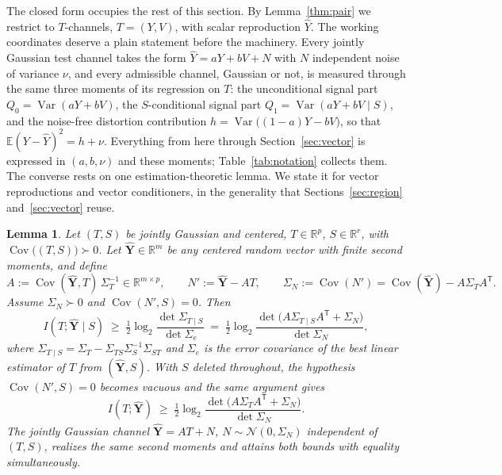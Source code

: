 \documentclass[11pt,onecolumn]{IEEEtran}
\newtheorem{lemma}[theorem]{Lemma}
\newcommand{\E}{\mathbb{E}}
\newcommand{\R}{\mathbb{R}}
\newcommand{\Cov}{\operatorname{Cov}}
\newcommand{\hY}{\widehat{Y}}
\begin{document}
The closed form occupies the rest of this section. By
Lemma~\ref{thm:pair} we restrict to $T$-channels, $T=(Y,V)$, with
scalar reproduction $\hY$. The working coordinates deserve a plain
statement before the machinery. Every jointly Gaussian test channel
takes the form $\hY=aY+bV+N$ with $N$ independent noise of variance
$\nu$, and every admissible channel, Gaussian or not, is measured through
the same three moments of its regression on $T$: the unconditional
signal part $Q_0=\operatorname{Var}(aY+bV)$, the $S$-conditional signal
part $Q_1=\operatorname{Var}(aY+bV\mid S)$, and the noise-free
distortion contribution $h=\operatorname{Var}\bigl((1-a)Y-bV\bigr)$, so
that $\E(Y-\hY)^2=h+\nu$. Everything from here through
Section~\ref{sec:vector} is expressed in $(a,b,\nu)$ and these moments;
Table~\ref{tab:notation} collects them. The converse rests on one
estimation-theoretic lemma. We state it for vector reproductions and
vector conditioners, in the generality that
Sections~\ref{sec:region} and~\ref{sec:vector} reuse.

\begin{lemma}
\label{lem:gauss}
Let $(T,S)$ be jointly Gaussian and centered, $T\in\R^p$, $S\in\R^r$,
with $\Cov\bigl((T,S)\bigr)\succ0$. Let $\hat{\mathbf Y}\in\R^m$ be any
centered random vector with finite second moments, and define
\[
A:=\Cov(\hat{\mathbf Y},T)\,\Sigma_T^{-1}\in\R^{m\times p},\qquad
N':=\hat{\mathbf Y}-AT,\qquad
\Sigma_N:=\Cov(N')=\Cov(\hat{\mathbf Y})-A\Sigma_TA^{\mathsf T}.
\]
Assume $\Sigma_N\succ0$ and $\Cov(N',S)=0$. Then
\begin{equation}
I(T;\hat{\mathbf Y}\mid S)\;\ge\;\tfrac12\log_2
\frac{\det\Sigma_{T\mid S}}{\det\Sigma_e}
\;=\;\tfrac12\log_2
\frac{\det\bigl(A\Sigma_{T\mid S}A^{\mathsf T}+\Sigma_N\bigr)}
{\det\Sigma_N},
\label{eq:lem-cond}
\end{equation}
where $\Sigma_{T\mid S}=\Sigma_T-\Sigma_{TS}\Sigma_S^{-1}\Sigma_{ST}$
and $\Sigma_e$ is the error covariance of the best linear estimator of
$T$ from $(\hat{\mathbf Y},S)$. With $S$ deleted throughout, the
hypothesis $\Cov(N',S)=0$ becomes vacuous and the same argument gives
\begin{equation}
I(T;\hat{\mathbf Y})\;\ge\;\tfrac12\log_2
\frac{\det\bigl(A\Sigma_TA^{\mathsf T}+\Sigma_N\bigr)}{\det\Sigma_N}.
\label{eq:lem-rate}
\end{equation}
The jointly Gaussian channel $\hat{\mathbf Y}=AT+N$,
$N\sim\mathcal N(0,\Sigma_N)$ independent of $(T,S)$, realizes the same
second moments and attains both bounds with equality simultaneously.
\end{lemma}
\end{document}
